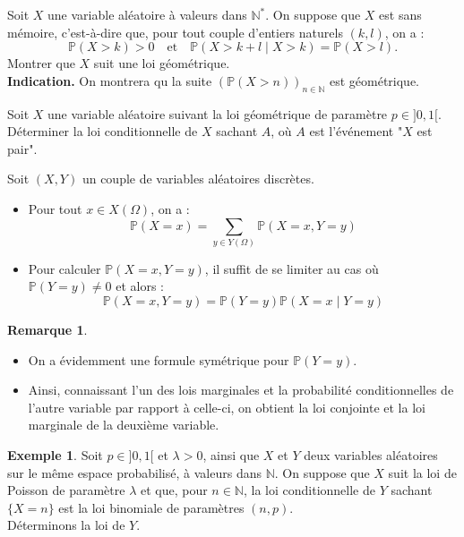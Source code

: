 \documentclass[french]{article}
\renewcommand{\P}{\mathbb{P}}
\newcommand{\N}{\mathbb{N}}
\newcommand{\st}{^*}
\theoremstyle{plain}
\theoremstyle{definition}
\newtheorem*{ex}{Exemple}
\newtheorem*{rmq}{Remarque}
\theoremstyle{remark}
\begin{document}
\begin{exo}
	Soit $X$ une variable aléatoire à valeurs dans $\N\st$. On suppose que $X$ est sans mémoire, c'est-à-dire que, pour tout couple d'entiers naturels $(k,l)$, on a :
	$$\P(X>k)>0\quad\text{et}\quad\P(X>k+l\mid X>k)=\P(X>l).$$
	Montrer que $X$ suit une loi géométrique. \\
	\textbf{Indication.} On montrera qu la suite $(\P(X>n))_{n\in\N}$ est géométrique.
\end{exo}

\begin{exo}
	Soit $X$ une variable aléatoire suivant la loi géométrique de paramètre $p\in]0,1[$. Déterminer la loi conditionnelle de $X$ sachant $A$, où $A$ est l'événement "$X$ est pair".
\end{exo}

\begin{met}
	Soit $(X,Y)$ un couple de variables aléatoires discrètes.
	\begin{itemize}
		\item Pour tout $x\in X(\Omega)$, on a : $$\P(X=x)=\sum_{y\in Y(\Omega)}\P(X=x,Y=y)$$
		\item Pour calculer $\P(X=x,Y=y)$, il suffit de se limiter au cas où $\P(Y=y)\ne 0$ et alors : $$\P(X=x,Y=y)=\P(Y=y)\P(X=x\mid Y=y)$$
	\end{itemize}
\end{met}

\begin{rmq}
	\begin{itemize}
		\item On a évidemment une formule symétrique pour $\P(Y=y)$.
		\item Ainsi, connaissant l'un des lois marginales et la probabilité conditionnelles de l'autre variable par rapport à celle-ci, on obtient la loi conjointe et la loi marginale de la deuxième variable.
	\end{itemize}
\end{rmq}

\begin{ex}
	Soit $p\in]0,1[$ et $\lambda>0$, ainsi que $X$ et $Y$ deux variables aléatoires sur le même espace probabilisé, à valeurs dans $\N$. On suppose que $X$ suit la loi de Poisson de paramètre $\lambda$ et que, pour $n\in\N$, la loi conditionnelle de $Y$ sachant $\{X=n\}$ est la loi binomiale de paramètres $(n,p)$.\\
	Déterminons la loi de $Y$.
\end{ex}
\end{document}
